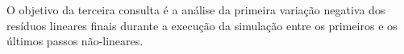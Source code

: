 O objetivo da terceira consulta é a análise da primeira variação negativa dos resíduos lineares finais durante a execução da simulação entre os primeiros e os últimos passos não-lineares. 



